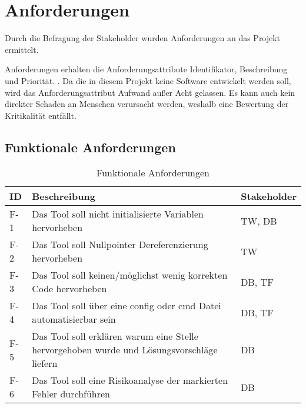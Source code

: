 \section{Anforderungen}
\label{sec:anforderungen}

Durch die Befragung der Stakeholder wurden Anforderungen an das Projekt ermittelt.

Anforderungen erhalten die Anforderungsattribute Identifikator, Beschreibung und Priorität.
\cite[S.~479~f.]{Balzert:Lehrbuch-der-softwaretechnik}. Da die in diesem Projekt keine Software entwickelt werden soll, wird das Anforderungsattribut \glqq{}Aufwand\grqq{} außer 
Acht gelassen. Es kann auch kein direkter Schaden an Menschen verursacht werden, weshalb eine Bewertung der \glqq{}Kritikalität\grqq{} entfällt.

\subsection{Funktionale Anforderungen}
\label{subsec:funktional}

\begin{table}[H]
    {
        \begin{tabularx}{\linewidth}{|C{1cm}|X|C{2cm}|}
            \hline
            ID
             & Beschreibung
             & Stakeholder
            \\
            \hline
            F-1
             & Das Tool soll nicht initialisierte Variablen hervorheben
             & TW, DB
            \\
            F-2
             & Das Tool soll Nullpointer Dereferenzierung hervorheben
             & TW
            \\
            F-3
             & Das Tool soll keinen/möglichst wenig korrekten Code hervorheben
             & DB, TF
            \\
            F-4
             & Das Tool soll über eine config oder cmd Datei automatisierbar sein
             & DB, TF
            \\
            F-5
             & Das Tool soll erklären warum eine Stelle hervorgehoben wurde und Lösungsvorschläge liefern
             & DB
            \\
            F-6
             & Das Tool soll eine Risikoanalyse der markierten Fehler durchführen
             & DB
            \\
            \hline
        \end{tabularx}
    }
    \caption{Funktionale Anforderungen}
    \label{tab:funktional}
\end{table}

